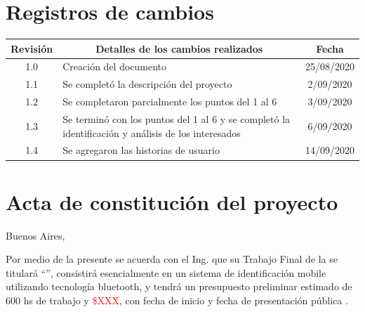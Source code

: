 \documentclass[11pt]{charter}
\begin{document}
\maketitle
\thispagestyle{empty}
\pagebreak


\thispagestyle{empty}
{\setlength{\parskip}{0pt}
\tableofcontents{}
}
\pagebreak


\section{Registros de cambios}
\label{sec:registro}


\begin{table}[ht]
\label{tab:registro}
\centering
\begin{tabularx}{\linewidth}{@{}|c|X|c|@{}}
\hline
\rowcolor[HTML]{C0C0C0} 
Revisión & \multicolumn{1}{c|}{\cellcolor[HTML]{C0C0C0}Detalles de los cambios realizados} & Fecha      \\ \hline
1.0      & Creación del documento                                          & 25/08/2020 \\ \hline
1.1      & Se completó la descripción del proyecto & 2/09/2020 \\ \hline
1.2      & Se completaron parcialmente los puntos del 1 al 6 & 3/09/2020 \\ \hline
1.3		& Se terminó con los puntos del 1 al 6 y se completó la identificación y análisis de los interesados & 6/09/2020 \\ \hline
1.4     & Se agregaron las historias de usuario & 14/09/2020 \\ \hline
\end{tabularx}
\end{table}

\pagebreak



\section{Acta de constitución del proyecto}
\label{sec:acta}

\begin{flushright}
Buenos Aires, \fechaInicioName
\end{flushright}

\vspace{2cm}

Por medio de la presente se acuerda con el Ing. \authorname\hspace{1px} que su Trabajo Final de la \degreename\hspace{1px} se titulará ``\ttitle'', consistirá esencialmente en un sistema de identificación mobile utilizando tecnología bluetooth, y tendrá un presupuesto preliminar estimado de 600 hs de trabajo y \textcolor{red}{\$XXX}, con fecha de inicio \fechaInicioName\hspace{1px} y fecha de presentación pública \fechaFinalName.
\end{document}
